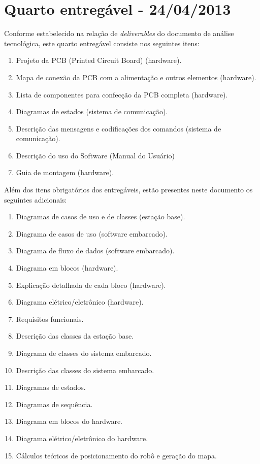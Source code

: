 \chapter{Quarto entregável - 24/04/2013}

Conforme estabelecido na relação de \textit{deliverables} do documento de análise tecnológica, este quarto entregável consiste nos seguintes itens:
\begin{enumerate}[topsep=0pt, partopsep=0pt, itemsep=0pt]
	\item Projeto da PCB (Printed Circuit Board) (hardware).
	\item Mapa de conexão da PCB com a alimentação e outros elementos (hardware).
	\item Lista de componentes para confecção da PCB completa (hardware).
	\item Diagramas de estados (sistema de comunicação).
	\item Descrição das mensagens e codificações dos comandos (sistema de comunicação).
	\item Descrição do uso do Software (Manual do Usuário)
	\item Guia de montagem (hardware).
\end{enumerate}

\vspace{12pt}

Além dos itens obrigatórios dos entregáveis, estão presentes neste documento os seguintes adicionais:
\begin{enumerate}
      \item Diagramas de casos de uso e de classes (estação base).
      \item Diagrama de casos de uso (software embarcado).
      \item Diagrama de fluxo de dados (software embarcado).
      \item Diagrama em blocos (hardware).
      \item Explicação detalhada de cada bloco (hardware).
      \item Diagrama elétrico/eletrônico (hardware).
	\item Requisitos funcionais.
	\item Descrição das classes da estação base.
	\item Diagrama de classes do sistema embarcado.
	\item Descrição das classes do sistema embarcado.
	\item Diagramas de estados.
	\item Diagramas de sequência.
	\item Diagrama em blocos do hardware.
	\item Diagrama elétrico/eletrônico do hardware.
	\item Cálculos teóricos de posicionamento do robô e geração do mapa.
\end{enumerate}

